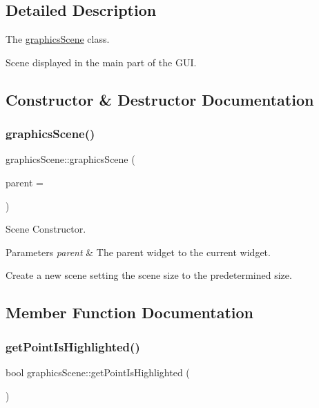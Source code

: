 \subsection{Detailed Description}
The \mbox{\hyperlink{classgraphics_scene}{graphics\+Scene}} class. 

Scene displayed in the main part of the G\+UI. 

\subsection{Constructor \& Destructor Documentation}
\mbox{\label{classgraphics_scene_a630f565d827637e6f46f5ae2e786cd06}} 
\subsubsection{\texorpdfstring{graphics\+Scene()}{graphicsScene()}}
{\footnotesize\ttfamily graphics\+Scene\+::graphics\+Scene (\begin{DoxyParamCaption}\item[{Q\+Object $\ast$}]{parent = {} }\end{DoxyParamCaption})\hspace{0.3cm}{\ttfamily [explicit]}}



Scene Constructor. 


\begin{DoxyParams}{Parameters}
{\em parent} & The parent widget to the current widget.\\
\hline
\end{DoxyParams}
Create a new scene setting the scene size to the predetermined size. 

\subsection{Member Function Documentation}
\mbox{\label{classgraphics_scene_ab84d166160c74279bae4f59c2ccac244}} 
\subsubsection{\texorpdfstring{get\+Point\+Is\+Highlighted()}{getPointIsHighlighted()}}
{\footnotesize\ttfamily bool graphics\+Scene\+::get\+Point\+Is\+Highlighted (\begin{DoxyParamCaption}{ }\end{DoxyParamCaption})}



